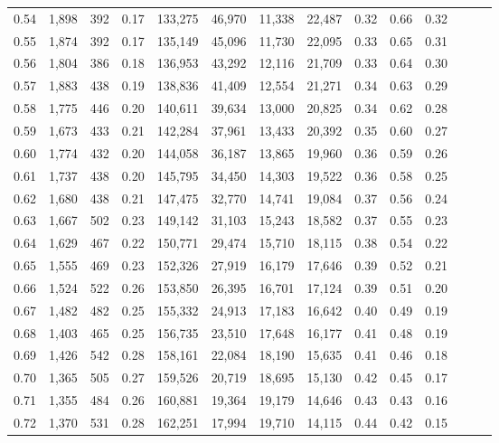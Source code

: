 \begin{tabular}{rrrrrrrrrrrrrr}
0.54 &  1,898 &  392 &  0.17 &  133,275 &   46,970 &  11,338 &  22,487 &  0.32 &  0.66 &      0.32 \\
0.55 &  1,874 &  392 &  0.17 &  135,149 &   45,096 &  11,730 &  22,095 &  0.33 &  0.65 &      0.31 \\
0.56 &  1,804 &  386 &  0.18 &  136,953 &   43,292 &  12,116 &  21,709 &  0.33 &  0.64 &      0.30 \\
0.57 &  1,883 &  438 &  0.19 &  138,836 &   41,409 &  12,554 &  21,271 &  0.34 &  0.63 &      0.29 \\
0.58 &  1,775 &  446 &  0.20 &  140,611 &   39,634 &  13,000 &  20,825 &  0.34 &  0.62 &      0.28 \\
0.59 &  1,673 &  433 &  0.21 &  142,284 &   37,961 &  13,433 &  20,392 &  0.35 &  0.60 &      0.27 \\
0.60 &  1,774 &  432 &  0.20 &  144,058 &   36,187 &  13,865 &  19,960 &  0.36 &  0.59 &      0.26 \\
0.61 &  1,737 &  438 &  0.20 &  145,795 &   34,450 &  14,303 &  19,522 &  0.36 &  0.58 &      0.25 \\
0.62 &  1,680 &  438 &  0.21 &  147,475 &   32,770 &  14,741 &  19,084 &  0.37 &  0.56 &      0.24 \\
0.63 &  1,667 &  502 &  0.23 &  149,142 &   31,103 &  15,243 &  18,582 &  0.37 &  0.55 &      0.23 \\
0.64 &  1,629 &  467 &  0.22 &  150,771 &   29,474 &  15,710 &  18,115 &  0.38 &  0.54 &      0.22 \\
0.65 &  1,555 &  469 &  0.23 &  152,326 &   27,919 &  16,179 &  17,646 &  0.39 &  0.52 &      0.21 \\
0.66 &  1,524 &  522 &  0.26 &  153,850 &   26,395 &  16,701 &  17,124 &  0.39 &  0.51 &      0.20 \\
0.67 &  1,482 &  482 &  0.25 &  155,332 &   24,913 &  17,183 &  16,642 &  0.40 &  0.49 &      0.19 \\
0.68 &  1,403 &  465 &  0.25 &  156,735 &   23,510 &  17,648 &  16,177 &  0.41 &  0.48 &      0.19 \\
0.69 &  1,426 &  542 &  0.28 &  158,161 &   22,084 &  18,190 &  15,635 &  0.41 &  0.46 &      0.18 \\
0.70 &  1,365 &  505 &  0.27 &  159,526 &   20,719 &  18,695 &  15,130 &  0.42 &  0.45 &      0.17 \\
0.71 &  1,355 &  484 &  0.26 &  160,881 &   19,364 &  19,179 &  14,646 &  0.43 &  0.43 &      0.16 \\
0.72 &  1,370 &  531 &  0.28 &  162,251 &   17,994 &  19,710 &  14,115 &  0.44 &  0.42 &      0.15 \\

\end{tabular}
